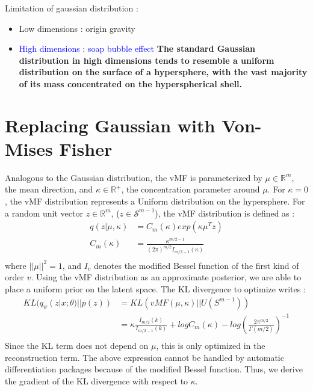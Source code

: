 \documentclass[12pt]{article}
\newcommand{\RR}{\mathbb{R}} %
\begin{document}
Limitation of gaussian distribution :
\begin{itemize}
    \item Low dimensions : origin gravity
    \item \textcolor{blue}{High dimensions : soap bubble effect}
        \textbf{The standard Gaussian distribution in high dimensions tends to resemble a uniform distribution on the surface of a hypersphere, with the vast majority of its mass concentrated on the hyperspherical shell.}
\end{itemize}

\section{Replacing Gaussian with Von-Mises Fisher}

Analogous to the Gaussian distribution, the vMF is parameterized by $\mu\in\RR^m$, the mean direction, and $\kappa\in\RR^+$, the concentration parameter around $\mu$. For $\kappa=0$, the vMF distribution represents a Uniform distribution on the hypersphere.
For a random unit vector $z\in\RR^m$, ($z\in\mathcal{S}^{m-1}$), the vMF distribution is defined as :
\begin{align*}
    q(z|\mu, \kappa) &= C_m(\kappa) exp(\kappa \mu^T z) \\
    C_m(\kappa) &= \frac{\kappa^{m/2-1}}{(2\pi)^{m/2}I_{m/2-1}(\kappa)} \\
\end{align*}
where $||\mu||^2 =1$, and $I_v$ denotes the modified Bessel function of the first kind of order $v$.
Using the vMF distribution as an approximate posterior, we are able to place a uniform prior on the latent space.
The KL divergence to optimize writes :
\begin{align*}
    KL(q_\psi(z|x; \theta) ||p(z)) &= KL(vMF(\mu, \kappa) || U(S^{m-1})) \\
    &= \kappa\frac{I_{m/2}(k)}{I_{m/2-1}(k)} + log C_m(\kappa) - log\left(\frac{2\pi^{m/2}}{\Gamma(m/2)}\right)^{-1}\\
\end{align*}
Since the KL term does not depend on $\mu$, this is only optimized in the reconstruction term. 
The above expression cannot be handled by automatic differentiation packages because of the modified Bessel function. Thus, we derive the gradient of the KL divergence with respect to $\kappa$. \\ 
\end{document}
